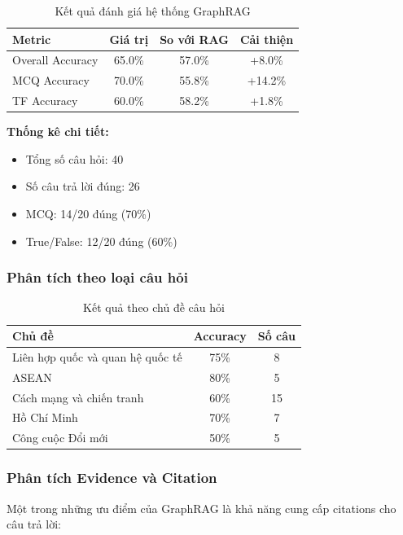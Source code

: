 \begin{table}[H]
\centering
\caption{Kết quả đánh giá hệ thống GraphRAG}
\label{tab:graphrag-results}
\begin{tabular}{|l|c|c|c|}
\hline
\textbf{Metric} & \textbf{Giá trị} & \textbf{So với RAG} & \textbf{Cải thiện} \\
\hline
Overall Accuracy & 65.0\% & 57.0\% & +8.0\% \\
MCQ Accuracy & 70.0\% & 55.8\% & +14.2\% \\
TF Accuracy & 60.0\% & 58.2\% & +1.8\% \\
\hline
\end{tabular}
\end{table}

\textbf{Thống kê chi tiết:}
\begin{itemize}
    \item Tổng số câu hỏi: 40
    \item Số câu trả lời đúng: 26
    \item MCQ: 14/20 đúng (70\%)
    \item True/False: 12/20 đúng (60\%)
\end{itemize}

\subsubsection{Phân tích theo loại câu hỏi}

\begin{table}[H]
\centering
\caption{Kết quả theo chủ đề câu hỏi}
\label{tab:topic-results}
\begin{tabular}{|l|c|c|}
\hline
\textbf{Chủ đề} & \textbf{Accuracy} & \textbf{Số câu} \\
\hline
Liên hợp quốc và quan hệ quốc tế & 75\% & 8 \\
ASEAN & 80\% & 5 \\
Cách mạng và chiến tranh & 60\% & 15 \\
Hồ Chí Minh & 70\% & 7 \\
Công cuộc Đổi mới & 50\% & 5 \\
\hline
\end{tabular}
\end{table}

\subsubsection{Phân tích Evidence và Citation}

Một trong những ưu điểm của GraphRAG là khả năng cung cấp citations cho câu trả lời:

